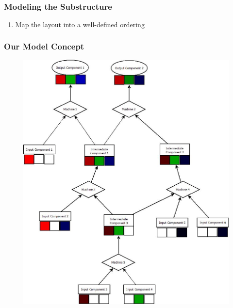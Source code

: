 \documentclass{beamer}
\begin{document}

\begin{frame}
\frametitle{Modeling the Substructure}
\begin{enumerate}
\item Map the layout into a well-defined ordering
\end{enumerate}
\end{frame}

\begin{frame}
\frametitle{Our Model Concept}
\begin{figure}
\includegraphics[width=0.5\linewidth]{BaseModel.jpeg}
\end{figure}
\end{frame}
\end{document}

